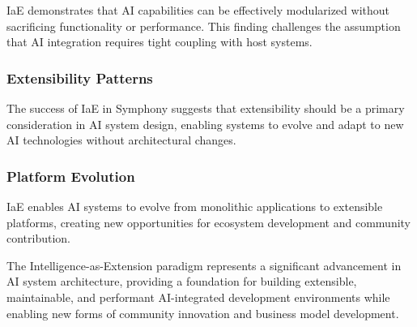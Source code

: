 IaE demonstrates that AI capabilities can be effectively modularized without sacrificing functionality or performance. This finding challenges the assumption that AI integration requires tight coupling with host systems.

\subsubsection{Extensibility Patterns}

The success of IaE in Symphony suggests that extensibility should be a primary consideration in AI system design, enabling systems to evolve and adapt to new AI technologies without architectural changes.

\subsubsection{Platform Evolution}

IaE enables AI systems to evolve from monolithic applications to extensible platforms, creating new opportunities for ecosystem development and community contribution.

The Intelligence-as-Extension paradigm represents a significant advancement in AI system architecture, providing a foundation for building extensible, maintainable, and performant AI-integrated development environments while enabling new forms of community innovation and business model development.
